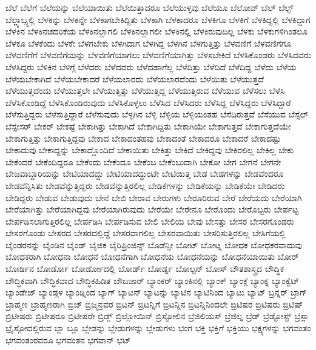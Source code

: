 {ಬೆಲೆ
ಬೆಲೆಗೆ
ಬೆಲೆಯನ್ನು
ಬೆಲೆಯಾಯಿತು
ಬೆಲೆಯಿತ್ತಾದರೂ
ಬೆಲೆಯುಳ್ಳವು
ಬೆಲೆಯೂ
ಬೆಲೋವ್
ಬೆಲ್
ಬೆಲ್ಟ್
ಬೆಲ್ಲ್ಯಾಬ್ಸ್ನಲ್ಲಿ
ಬೆಳಕನ್ನು
ಬೆಳಕನ್ನೇ
ಬೆಳಕಾಗಬೇಕಿದ್ದಿತು
ಬೆಳಕಾಗಿ
ಬೆಳಕಾದರೂ
ಬೆಳಕಿಗೂ
ಬೆಳಕಿಗೆ
ಬೆಳಕಿದ್ದಲ್ಲಿ
ಬೆಳಕಿದ್ದಾಗ
ಬೆಳಕಿನ
ಬೆಳಕಿನಚದರಿಕೆಯ
ಬೆಳಕಿನಲ್ಲಾಗಲಿ
ಬೆಳಕಿನಲ್ಲಾಗಲೀ
ಬೆಳಕಿನಲ್ಲಿ
ಬೆಳಕಿರುವುದಿಲ್ಲ
ಬೆಳಕು
ಬೆಳಕುಗಳಿಗಿಂತಲೂ
ಬೆಳಕೂ
ಬೆಳಕೆಂದು
ಬೆಳಕೇ
ಬೆಳಗಬೇಕು
ಬೆಳಗಿದಾಗ
ಬೆಳಗಿದ್ದ
ಬೆಳಗಿನ
ಬೆಳಗುತ್ತಿತ್ತು
ಬೆಳವಣಿಗೆ
ಬೆಳವಣಿಗೆಗೂ
ಬೆಳವಣಿಗೆಗೆ
ಬೆಳವಣಿಗೆಯನ್ನು
ಬೆಳವಣಿಗೆಯಾಗಲು
ಬೆಳವಣಿಗೆಯಾಗಿತ್ತು
ಬೆಳಸಬೇಕಿದೆ
ಬೆಳಸಿಕೊಂಡರು
ಬೆಳಸಿದವರು
ಬೆಳಸಿದ್ದರು
ಬೆಳಿಕಿನ
ಬೆಳಿಗ್ಗೆ
ಬೆಳೆದರು
ಬೆಳೆದವರು
ಬೆಳೆದಹಾಗೆಲ್ಲ
ಬೆಳೆದಿತ್ತು
ಬೆಳೆದಿದೆ
ಬೆಳೆದಿದ್ದ
ಬೆಳೆದು
ಬೆಳೆಯ
ಬೆಳೆಯಬೇಕಾಗಿದೆ
ಬೆಳೆಯಬೇಕಾದರೆ
ಬೆಳೆಯಲಾರದು
ಬೆಳೆಯಲಾರದೆಂದು
ಬೆಳೆಯಿತು
ಬೆಳೆಯುತ್ತದೆ
ಬೆಳೆಯುತ್ತದೆಂದು
ಬೆಳೆಯುತ್ತಲೇ
ಬೆಳೆಯುತ್ತಿತ್ತು
ಬೆಳೆಯುತ್ತಿದ್ದ
ಬೆಳೆಯುತ್ತಿರುವ
ಬೆಳೆಯುವ
ಬೆಳೆಸಲು
ಬೆಳೆಸಿ
ಬೆಳೆಸಿಕೊಂಡಿದ್ದೆ
ಬೆಳೆಸಿಕೊಂಡಿರುವುದು
ಬೆಳೆಸಿಕೊಳ್ಳಲು
ಬೆಳೆಸಿದ
ಬೆಳೆಸಿದರು
ಬೆಳೆಸಿದ್ದ
ಬೆಳೆಸಿದ್ದರು
ಬೆಳೆಸಿದ್ದಾರೆ
ಬೆಳೆಸುತ್ತಿದ್ದರು
ಬೆಳೆಸುತ್ತಿದ್ದಾರೆ
ಬೆಳೆಸುವುದು
ಬೆಳ್ಳಗಿನ
ಬೆಳ್ಳಿ
ಬೆಳ್ಳಿಯ
ಬೆಳ್ಳಿಯಂತಹ
ಬೆಸೆದಿರುತ್ತವೆ
ಬೆಸೆಯುವ
ಬೆಸ್ಸೆಲ್
ಬೆಸ್ಸೇಸರ್
ಬೇಕರ್
ಬೇಕಷ್ಟೆ
ಬೇಕಾಗಿತ್ತು
ಬೇಕಾಗಿದೆ
ಬೇಕಾಗಿದ್ದಿತು
ಬೇಕಾಗಿಯೇ
ಬೇಕಾಗುತ್ತದೆ
ಬೇಕಾಗುತ್ತದೆಯೇ
ಬೇಕಾಗುತ್ತಿತ್ತು
ಬೇಕಾಗುತ್ತಿದ್ದವು
ಬೇಕಾದ
ಬೇಕಾದಂತಹವು
ಬೇಕಾದಂತೆ
ಬೇಕಾದರೂ
ಬೇಕಾದರೆ
ಬೇಕಾದಷ್ಟು
ಬೇಕಾದುವು
ಬೇಕಾದ್ದನ್ನು
ಬೇಕಾದ್ದೊಂದಿದೆ
ಬೇಕಾಯಿತು
ಬೇಕಿತ್ತು
ಬೇಕಿದೆ
ಬೇಕಿದ್ದವು
ಬೇಕಿರಲಿಲ್ಲ
ಬೇಕಿಲ್ಲ
ಬೇಕು
ಬೇಕೆಂದರೆ
ಬೇಕೆಂದಿದ್ದರೂ
ಬೇಕೆಂದು
ಬೇಕೆಂದೂ
ಬೇಕೆಂಬ
ಬೇಕೆಂಬುದಾಗಿ
ಬೇಕೋ
ಬೇಗ
ಬೇಗನೆ
ಬೇಗನೇ
ಬೇಜವಾಬ್ದಾರಿಯನ್ನು
ಬೇಟಿಯಾದದ್ದು
ಬೇಟಿಯಾದದ್ದುಂಟೇ
ಬೇಟಿಯಿತ್ತ
ಬೇಡ
ಬೇಡಗಳನ್ನು
ಬೇಡವೆಂದರೂ
ಬೇಡವೆನ್ನಿಸಿತು
ಬೇಡವೆನ್ನುತ್ತಿದ್ದರು
ಬೇಡವೆನ್ನುತ್ತಿರಲಿಲ್ಲ
ಬೇಡಿಕೆಗಳನ್ನು
ಬೇಡಿಕೆಯನ್ನು
ಬೇಡಿಕೆಯೇ
ಬೇಡಿದರು
ಬೇಡಿದ್ದರು
ಬೇಡುವ
ಬೇಡುವುದು
ಬೇನೆ
ಬೇಬಿ
ಬೇರಾವ
ಬೇರುಗಳು
ಬೇರೂರಿರುವ
ಬೇರೆ
ಬೇರೆಯದು
ಬೇರೆಯಾಗಿ
ಬೇರೆಯಾಗಿತ್ತು
ಬೇರೆಯಾಗಿದ್ದವು
ಬೇರೆಯಾಗಿರುವುದು
ಬೇರೆಯೇ
ಬೇರೇನೂ
ಬೇರೊಂದು
ಬೇರೊಬ್ಬರು
ಬೇರ್ಪಟ್ಟ
ಬೇರ್ಪಡಿಸಲಾಗುತ್ತಿರಲಿಲ್ಲ
ಬೇರ್ಪಡಿಸಿ
ಬೇರ್ಪಡಿಸುವ
ಬೇಲಿ
ಬೇಲಿಯ
ಬೇವು
ಬೇಸತ್ತು
ಬೇಸರ
ಬೇಸರಗೊಂಡರು
ಬೇಸರಗೊಂಡು
ಬೇಸರದ
ಬೇಸರದಲ್ಲಿದ್ದೆ
ಬೇಸರವಾಗಲಿಲ್ಲ
ಬೇಸರವಾಯಿತು
ಬೇಸರಿಸುತ್ತಿರಲಿಲ್ಲ
ಬೇಸಿಗೆಯಲ್ಲಿ
ಬೈಂಡರನನ್ನು
ಬೈಂಡಿನ
ಬೈಂಡ್
ಬೈಜಿಕ
ಬೈರಿಫ್ರಿಂಜಿನ್ಸ್
ಬೊಡೆನ್ಸೀ
ಬೋಟ್
ಬೋಟ್ನ
ಬೋಧಕ
ಬೋಧಕರವಾದುವು
ಬೋಧಕರಾಗಿ
ಬೋಧನಾ
ಬೋಧನೆ
ಬೋಧನೆಗಾಗಿ
ಬೋಧನೆಯ
ಬೋಧನೆಯನ್ನು
ಬೋಧನೆಯಾಯಿತು
ಬೋರ್
ಬೋರ್ಡಿನ
ಬೋರ್ಡೋ
ಬೋರ್ಡೋದಲ್ಲಿ
ಬೋರ್ಡ್
ಬೋರ್ಡ್ನ
ಬೋಲ್ಟನ್
ಬೋಸ್
ಬೌತಶಾಸ್ತ್ರದ
ಬೌದ್ಧಿಕ
ಬೌದ್ಧಿಕವಾಗಿ
ಬೌದ್ಧಿಕವಾದ
ಬೌದ್ಧಿಕಹಿಡಿತ
ಬೌಬಜಾರ್
ಬ್ಯಾಂಕರ್
ಬ್ಯಾಂಕಿನಲ್ಲಿ
ಬ್ಯಾಂಕ್
ಬ್ಯಾಂಕ್ಗೆ
ಬ್ಯಾಂಕ್ನ
ಬ್ಯಾಂಕ್ವೆಟ್
ಬ್ಯಾಂಡೇಜ್
ಬ್ಯಾಂಡ್ಗಳ
ಬ್ಯಾಂಡ್ನಿಂದ
ಬ್ಯಾಗ್
ಬ್ಯಾಟನ್
ಬ್ಯಾಟನ್ನು
ಬ್ಯಾಟಿನ
ಬ್ಯಾಟಿನಿಂದ
ಬ್ಯಾಟು
ಬ್ಯಾಟ್
ಬ್ರನ್ನರ್
ಬ್ರಾಗ್
ಬ್ರಾಹ್ಮಣ
ಬ್ರಾಹ್ಮಣರಾಗಿ
ಬ್ರಿಜ್
ಬ್ರಿಜ್ಮನ್ರವರ
ಬ್ರಿಟನ್
ಬ್ರಿಟನ್ನಿಗೆ
ಬ್ರಿಟನ್ನಿನ
ಬ್ರಿಟನ್ನಿನಿಂದಲೇ
ಬ್ರಿಟಿಷರ
ಬ್ರಿಟಿಷರು
ಬ್ರಿಟಿಷ್
ಬ್ರಿಟೀಷರು
ಬ್ರಿಟೀಷರೂ
ಬ್ರಿಟೀಷರೇ
ಬ್ರಿಡ್ಜ್
ಬ್ರಿಲ್ಲೋಯಿನ್
ಬ್ರಿಸ್ಟೋಲಿನ
ಬ್ರೆಜಿಲಿಯಸ್
ಬ್ರೆಜಿಲ್ನ
ಬ್ರೆಡ್
ಬ್ರೆಡ್ಟೋಸ್ಟ್
ಬ್ರೆಸ್ಲಾ
ಬ್ರೈಸ್ಗೋದಲ್ಲಿರುವ
ಬ್ಲಾ
ಬ್ಲೂ
ಬ್ಲೇಡನ್ನು
ಬ್ಲೇಡುಗಳನ್ನು
ಬ್ಲೇಡುಗಳು
ಭಂಗ
ಭಕ್ತಿ
ಭಕ್ತಿಗೆ
ಭಕ್ತಿಯು
ಭಕ್ಷ್ಯಗಳನ್ನು
ಭಗವಂತಂ
ಭಗವಂತಂರವರೂ
ಭಗವಂತನ
ಭಗವಾನ್
ಭಟ್
}
